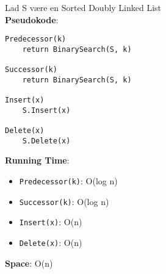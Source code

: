 Lad S være en Sorted Doubly Linked List\\
\textbf{Pseudokode}:
\begin{lstlisting}[frame=single, mathescape=true]
Predecessor(k)
	return BinarySearch(S, k)

Successor(k)
	return BinarySearch(S, k)

Insert(x)
	S.Insert(x)

Delete(x)
	S.Delete(x)
\end{lstlisting}
\textbf{Running Time}:
\begin{itemize}
	\item \texttt{Predecessor(k)}: O(log n)
	\item \texttt{Successor(k)}: O(log n)
	\item \texttt{Insert(x)}: O(n)
	\item \texttt{Delete(x)}: O(n)
\end{itemize}
\textbf{Space}: O(n)